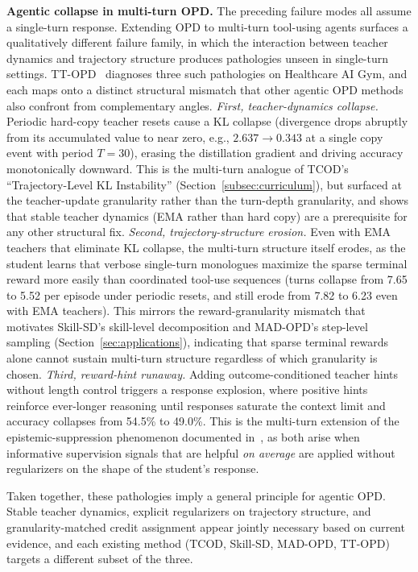 \documentclass{article} %
\begin{document}
\textbf{Agentic collapse in multi-turn OPD.} The preceding failure modes all assume a single-turn response. Extending OPD to multi-turn tool-using agents surfaces a qualitatively different failure family, in which the interaction between teacher dynamics and trajectory structure produces pathologies unseen in single-turn settings. TT-OPD~\citep{2605.02943} diagnoses three such pathologies on Healthcare AI Gym, and each maps onto a distinct structural mismatch that other agentic OPD methods also confront from complementary angles. \emph{First, teacher-dynamics collapse.} Periodic hard-copy teacher resets cause a KL collapse (divergence drops abruptly from its accumulated value to near zero, e.g., $2.637 \to 0.343$ at a single copy event with period $T{=}30$), erasing the distillation gradient and driving accuracy monotonically downward. This is the multi-turn analogue of TCOD's ``Trajectory-Level KL Instability'' (Section~\ref{subsec:curriculum}), but surfaced at the teacher-update granularity rather than the turn-depth granularity, and shows that stable teacher dynamics (EMA rather than hard copy) are a prerequisite for any other structural fix. \emph{Second, trajectory-structure erosion.} Even with EMA teachers that eliminate KL collapse, the multi-turn structure itself erodes, as the student learns that verbose single-turn monologues maximize the sparse terminal reward more easily than coordinated tool-use sequences (turns collapse from 7.65 to 5.52 per episode under periodic resets, and still erode from 7.82 to 6.23 even with EMA teachers). This mirrors the reward-granularity mismatch that motivates Skill-SD's skill-level decomposition and MAD-OPD's step-level sampling (Section~\ref{sec:applications}), indicating that sparse terminal rewards alone cannot sustain multi-turn structure regardless of which granularity is chosen. \emph{Third, reward-hint runaway.} Adding outcome-conditioned teacher hints without length control triggers a response explosion, where positive hints reinforce ever-longer reasoning until responses saturate the context limit and accuracy collapses from 54.5\% to 49.0\%. This is the multi-turn extension of the epistemic-suppression phenomenon documented in~\citet{2603.24472}, as both arise when informative supervision signals that are helpful \emph{on average} are applied without regularizers on the shape of the student's response.

Taken together, these pathologies imply a general principle for agentic OPD. Stable teacher dynamics, explicit regularizers on trajectory structure, and granularity-matched credit assignment appear jointly necessary based on current evidence, and each existing method (TCOD, Skill-SD, MAD-OPD, TT-OPD) targets a different subset of the three.
\end{document}
